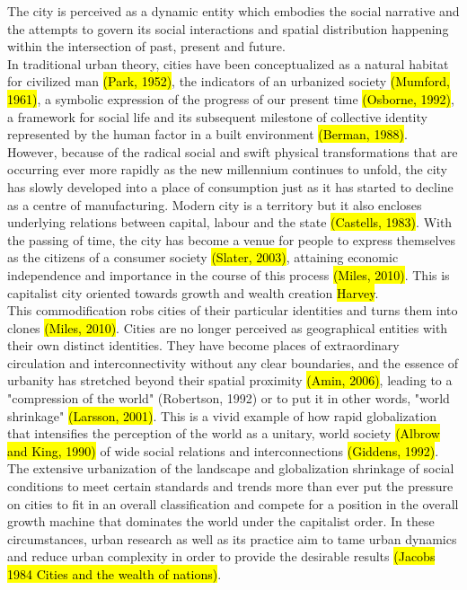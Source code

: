 \documentclass[11pt]{report}
\begin{document}
The city is perceived as a dynamic entity which embodies the social narrative and the attempts to govern its social interactions and spatial distribution happening within the intersection of past, present and future.
\\
In traditional urban theory, cities have been conceptualized as a natural habitat for civilized man \hl{(Park, 1952)}, the indicators 
of an urbanized society \hl{(Mumford, 1961)}, a symbolic expression of the progress of our present time \hl{(Osborne, 1992)}, a 
framework for social life and its subsequent milestone of collective identity represented by the human factor in a built environment \hl{(Berman, 1988)}. However, because of the radical social and swift physical transformations that are occurring ever more rapidly as the new millennium continues to unfold, the city has slowly developed into a place of consumption just as it has started to decline as a centre of manufacturing.
Modern city is a territory but it also encloses underlying relations between capital, labour
and the state \hl{(Castells, 1983)}.
With the passing of time, the city has become a venue for people to express themselves as the citizens of a consumer society \hl{(Slater, 2003)}, attaining economic independence and importance in the course of this process \hl{(Miles, 2010)}. This is capitalist city oriented towards growth and wealth creation \hl{Harvey}.
\\   
This commodification robs cities of their particular identities and turns them into clones \hl{(Miles, 2010)}. Cities are no longer 
perceived as geographical entities with their own distinct identities. They have become places of extraordinary circulation and 
interconnectivity without any clear boundaries, and the essence of urbanity has stretched beyond their spatial proximity \hl{(Amin,  2006)},  leading  to  a  "compression  of  the  world"  (Robertson,  1992)  or  to  put  it  in  other  words,  "world  shrinkage"
\hl{(Larsson, 2001)}. This is a vivid example of how rapid globalization that intensifies the perception of the world as a unitary, world society \hl{(Albrow and King, 1990)} of wide social relations and interconnections \hl{(Giddens, 1992)}. 
\\
The extensive urbanization of the landscape and globalization shrinkage of social conditions to meet certain standards and trends more than ever put the pressure on cities to fit in an overall classification and compete for a position in the overall growth machine that dominates the world under the capitalist order.
In these circumstances, urban research as well as its practice aim to tame urban dynamics and reduce urban complexity in order to provide the desirable results \hl{(Jacobs 1984 Cities and the wealth of nations)}.
\end{document}
